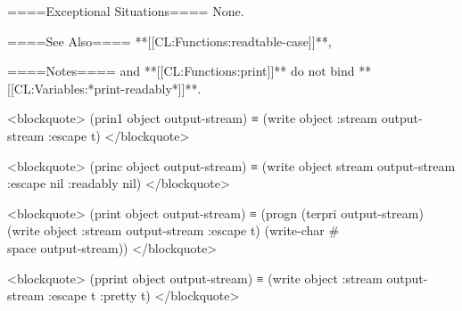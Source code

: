 ====Exceptional Situations====
None.

====See Also====
**[[CL:Functions:readtable-case]]**, {\secref\FORMATPrinterOps}

====Notes====
 and **[[CL:Functions:print]]** do not bind **[[CL:Variables:*print-readably*]]**.

<blockquote> (prin1 object output-stream) ≡ (write object :stream output-stream :escape t) </blockquote>

<blockquote> (princ object output-stream) ≡ (write object stream output-stream :escape nil :readably nil) </blockquote>

<blockquote> (print object output-stream) ≡ (progn (terpri output-stream) (write object :stream output-stream :escape t) (write-char #\\space output-stream)) </blockquote>

<blockquote> (pprint object output-stream) ≡ (write object :stream output-stream :escape t :pretty t) </blockquote>

  
